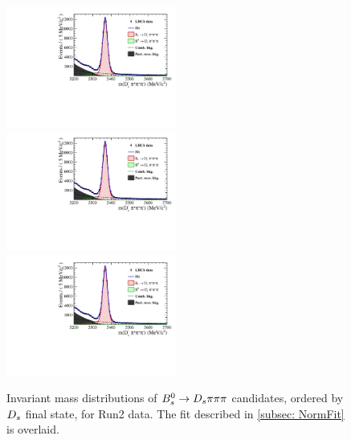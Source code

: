 \begin{figure}[h]
\includegraphics[height=!,width=0.5\textwidth]{figs/MassFit/norm_y16_KsK.pdf}
\includegraphics[height=!,width=0.5\textwidth]{figs/MassFit/norm_y16_KKpi_NR.pdf}
\includegraphics[height=!,width=0.5\textwidth]{figs/MassFit/norm_y16_pipipi.pdf}
\caption{Invariant mass distributions of ${{B}^0_{s}}\rightarrow{\ensuremath{{D}_{s}}}{\ensuremath{\pi}}{\ensuremath{\pi}}{\ensuremath{\pi}}$ candidates, ordered by ${{D}_{s}}$ final state, for Run2 data.
The fit described in \ref{subsec: NormFit} is overlaid.}
\label{fig:massfits_norm_Run2}
\end{figure}

\clearpage

